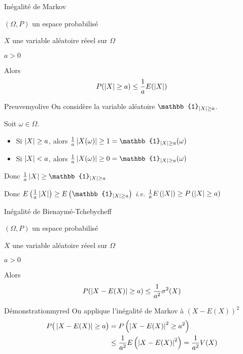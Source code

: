     \begin{prop}{Inégalité de Markov}{}
        \begin{soient}
            \item $(\Omega,P)$ un espace probabilisé
            \item $X$ une variable aléatoire réeel sur $\Omega$
            \item $a > 0$
        \end{soient}
        Alors 
        \[ P(\left\lvert X\right\rvert \geq a) \leq \frac{1}{a} E(\left\lvert X\right\rvert) \] 
    \end{prop}

    \begin{demo}{Preuve}{myolive}
        On considère la variable aléatoire $\mathbb{1}_{\abs{X} \geq a}$.
        
        Soit $\omega \in \Omega$.
        \begin{itemize}
            \item Si $\left\lvert X\right\rvert \geq a$, alors $\frac{1}{a} \abs{X(\omega)} \geq 1 = \mathbb{1}_{\abs{X} \geq a}(\omega)$
            \item Si $\left\lvert X\right\rvert < a$, alors $\frac{1}{a} \abs{X(\omega)} \geq 0 = \mathbb{1}_{\abs{X} \geq a}(\omega)$
        \end{itemize}
        Donc $\frac{1}{a}\abs{X} \geq \mathbb{1}_{\abs{X} \geq a}$
        
        Donc $E\left(\frac{1}{a}\abs{X}\right) \geq E\left(\mathbb{1}_{\abs{X} \geq a}\right)$ \textit{i.e.} $\frac{1}{a}E\left(\left\lvert X\right\rvert\right) \geq P\left(\left\lvert X\right\rvert \geq a\right)$
    \end{demo}

    \begin{theo}{Inégalité de Bienaymé-Tchebycheff}{}
        \begin{soient}
            \item $(\Omega,P)$ un espace probabilisé
            \item $X$ une variable aléatoire réeel sur $\Omega$
            \item $a > 0$
        \end{soient}
        Alors 
        \[ P(\left\lvert X- E(X)\right\rvert \geq a) \leq \frac{1}{a^2} \sigma^2(X) \] 
    \end{theo}

    \begin{demo}{Démonstration}{myred}
        On applique l’inégalité de Markov à $\left(X - E(X)\right)^2$
        \begin{align*}
            P\big(\left\lvert X-E(X)\right\rvert \geq a\big) &= P\left(\left\lvert X-E(X)\right\rvert^2 \geq a^2\right) \\
            &\leq \frac{1}{a^2} E\left(\left\lvert X-E(X)\right\rvert^2\right) = \frac{1}{a^2}V(X)
        \end{align*}
    \end{demo}
















